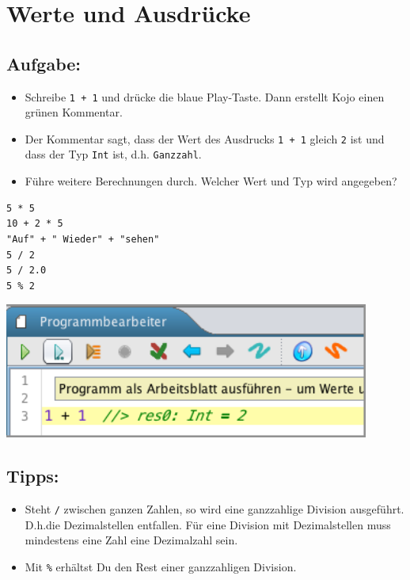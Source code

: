 \chapter{Werte und Ausdrücke}
\begin{multicols}{2}
\section*{\color{BrickRed}Aufgabe:}


\begin{itemize}

\item {Schreibe \lstinline{1 + 1} und drücke die blaue Play-Taste. Dann erstellt Kojo einen grünen Kommentar.}
\item {Der Kommentar sagt, dass der Wert des Ausdrucks \lstinline{1 + 1} gleich \lstinline{2} ist und dass der Typ \lstinline{Int} ist, d.h. \lstinline{Ganzzahl}.}
\item {Führe weitere Berechnungen durch. Welcher Wert und Typ wird angegeben?}

\end{itemize}



\begin{lstlisting}[numbers=none]
5 * 5
10 + 2 * 5
"Auf" + " Wieder" + "sehen"
5 / 2
5 / 2.0
5 % 2
\end{lstlisting}
        


\columnbreak


\includegraphics[width=12.0cm]{../img/show-value_de.png}
\section*{\color{OliveGreen}Tipps:}


\begin{itemize}

\item {Steht \lstinline{/} zwischen ganzen Zahlen, so wird eine ganzzahlige Division ausgeführt. D.h.die Dezimalstellen entfallen. Für eine Division mit Dezimalstellen muss mindestens eine Zahl eine Dezimalzahl sein.}
\item {Mit \lstinline{%} erhältst Du den Rest einer ganzzahligen Division.}

\end{itemize}


\end{multicols}

